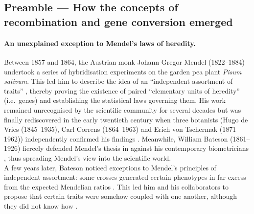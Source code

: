 \subsection*{Preamble — How the concepts of recombination and gene conversion emerged}

\paragraph{An unexplained exception to Mendel's laws of heredity.}
Between 1857 and 1864, the Austrian monk Johann Gregor Mendel (1822--1884) undertook a series of hybridisation experiments on the garden pea plant \textit{Pisum sativum}. This led him to describe the idea of an “independent assortment of traits” \citep{mendel1996experiments}, thereby proving the existence of paired “elementary units of heredity” (i.e.\ genes) and establishing the statistical laws governing them.
His work remained unrecognised by the scientific community for several decades but was finally rediscovered in the early twentieth century when three botanists (Hugo de Vries (1845--1935), Carl Correns (1864--1963) and Erich von Tschermak (1871--1962)) independently confirmed his findings \citep{dunn2003gregor}.
Meanwhile, William Bateson (1861--1926) fiercely defended Mendel's thesis in \textit{} \citep{bateson1902mendel} against his contemporary biometricians \citep[reviewed in][]{bateson2002william}, thus spreading Mendel's view into the scientific world.\\

A few years later, Bateson noticed exceptions to Mendel's principles of independent assortment: some crosses generated certain phenotypes in far excess from the expected Mendelian ratios \citep{bateson1905experimentalpea}. This led him and his collaborators to propose that certain traits were somehow coupled with one another, although they did not know how \citep{bateson1905experimental}. 



